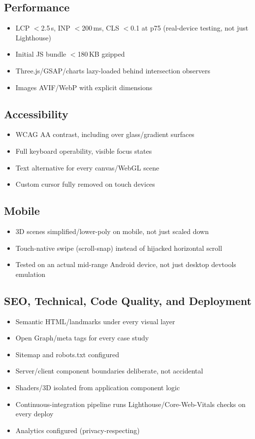 \documentclass[conference]{IEEEtran}
\begin{document}
\subsection{Performance}
\begin{itemize}[leftmargin=*]
\item LCP $<$2.5\,s, INP $<$200\,ms, CLS $<$0.1 at p75 (real-device testing, not just Lighthouse)
\item Initial JS bundle $<$180\,KB gzipped
\item Three.js/GSAP/charts lazy-loaded behind intersection observers
\item Images AVIF/WebP with explicit dimensions
\end{itemize}

\subsection{Accessibility}
\begin{itemize}[leftmargin=*]
\item WCAG AA contrast, including over glass/gradient surfaces
\item Full keyboard operability, visible focus states
\item Text alternative for every canvas/WebGL scene
\item Custom cursor fully removed on touch devices
\end{itemize}

\subsection{Mobile}
\begin{itemize}[leftmargin=*]
\item 3D scenes simplified/lower-poly on mobile, not just scaled down
\item Touch-native swipe (scroll-snap) instead of hijacked horizontal scroll
\item Tested on an actual mid-range Android device, not just desktop devtools emulation
\end{itemize}

\subsection{SEO, Technical, Code Quality, and Deployment}
\begin{itemize}[leftmargin=*]
\item Semantic HTML/landmarks under every visual layer
\item Open Graph/meta tags for every case study
\item Sitemap and robots.txt configured
\item Server/client component boundaries deliberate, not accidental
\item Shaders/3D isolated from application component logic
\item Continuous-integration pipeline runs Lighthouse/Core-Web-Vitals checks on every deploy
\item Analytics configured (privacy-respecting)
\end{itemize}
\end{document}
